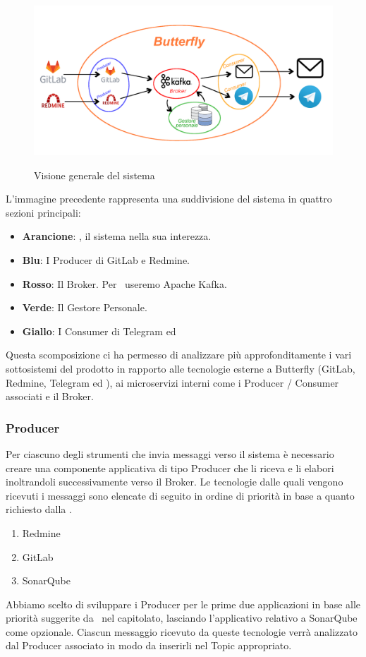 	\begin{figure}[H]
		\centering
		\includegraphics[width=\textwidth]{img/butterfly.png}\\
		\caption{Visione generale del sistema \progetto}
		\label{fig:butterfly}
	\end{figure}
\newpage
	L'immagine precedente rappresenta una suddivisione del sistema in quattro sezioni principali:
	\begin{itemize}
		\item \textbf{Arancione}: \progetto, il sistema nella sua interezza.
		\item \textbf{Blu}: I Producer di GitLab e Redmine.
		\item \textbf{Rosso}: Il Broker. Per \progetto\ useremo Apache Kafka.
		\item \textbf{Verde}: Il Gestore Personale.
		\item \textbf{Giallo}: I Consumer di Telegram ed \mail
	\end{itemize}
	Questa scomposizione ci ha permesso di analizzare più approfonditamente i vari sottosistemi del prodotto in rapporto alle tecnologie esterne a Butterfly (GitLab, Redmine, Telegram ed \mail), ai microservizi interni come i Producer / Consumer associati e il Broker.

	\subsubsection{Producer}\label{TecnologieProducer}
	
		Per ciascuno degli strumenti che invia messaggi verso il sistema è necessario creare una componente applicativa di tipo Producer che li riceva e li elabori inoltrandoli successivamente verso il Broker.
		Le tecnologie dalle quali vengono ricevuti i messaggi sono elencate di seguito in ordine di priorità in base a quanto richiesto dalla .
		\begin{enumerate}
			\item Redmine
			\item GitLab
			\item SonarQube
		\end{enumerate}
		Abbiamo scelto di sviluppare i Producer per le prime due applicazioni in base alle priorità suggerite da \II\ nel capitolato, lasciando l'applicativo relativo a SonarQube come opzionale.
		Ciascun messaggio ricevuto da queste tecnologie verrà analizzato dal Producer associato in modo da inserirli nel Topic appropriato.

